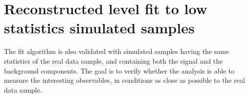 




\section{Reconstructed level fit to low statistics simulated samples}
\label{sec:datalike-MC}

The fit algorithm is also validated with simulated samples having the same statistics of the real data sample, and containing both the signal and the background components.
The goal is to verify whether the analysis is able to measure the interesting observables, in conditions as close as possible to the real data sample.

